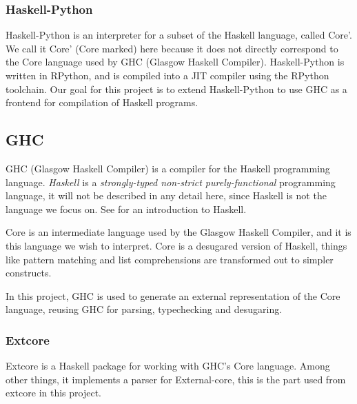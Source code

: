 \subsubsection{Haskell-Python}

Haskell-Python is an interpreter for a subset of the Haskell language, called Core'.
We call it Core' (Core marked) here because it does not directly correspond to 
the Core language
used by GHC (Glasgow Haskell Compiler). Haskell-Python is written in RPython,
and is compiled into a JIT compiler using the RPython toolchain. Our goal for this
project is to extend Haskell-Python to use GHC as a frontend for compilation 
of Haskell programs.

\subsection{GHC}

GHC (Glasgow Haskell Compiler) is a compiler for the Haskell programming language.
\emph{Haskell} is a \emph{strongly-typed non-strict purely-functional} 
programming language, it will not be described in any detail here, since 
Haskell is not the language we focus on. See \cite{hudak1992report}
for an introduction to Haskell. 

Core is an intermediate language used by the Glasgow Haskell Compiler\cite{ghc},
and it is this language we wish to interpret. Core is a desugared version of Haskell, 
things like pattern matching
and list comprehensions are transformed out to simpler constructs.\cite{jones1994compilation}

In this project, GHC is used to generate an external representation of the Core language,
reusing GHC for parsing, typechecking and desugaring.

\subsubsection{Extcore}

Extcore is a Haskell package for working with GHC's Core language. Among other things,
it implements a parser for External-core, this is the part used from extcore in this project.

